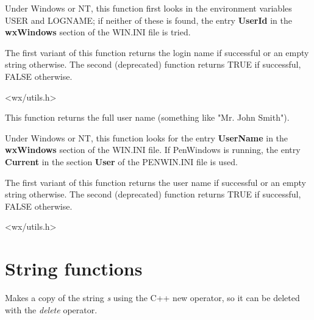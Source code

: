 Under Windows or NT, this function first looks in the environment
variables USER and LOGNAME; if neither of these is found, the entry {\bf UserId}\rtfsp
in the {\bf wxWindows} section of the WIN.INI file is tried.

The first variant of this function returns the login name if successful or an
empty string otherwise. The second (deprecated) function returns TRUE
if successful, FALSE otherwise.




<wx/utils.h>

\label{wxgetusername}



This function returns the full user name (something like "Mr. John Smith").

Under Windows or NT, this function looks for the entry {\bf UserName}\rtfsp
in the {\bf wxWindows} section of the WIN.INI file. If PenWindows
is running, the entry {\bf Current} in the section {\bf User} of
the PENWIN.INI file is used.

The first variant of this function returns the user name if successful or an
empty string otherwise. The second (deprecated) function returns TRUE
if successful, FALSE otherwise.




<wx/utils.h>

\section{String functions}



Makes a copy of the string {\it s} using the C++ new operator, so it can be
deleted with the {\it delete} operator.



